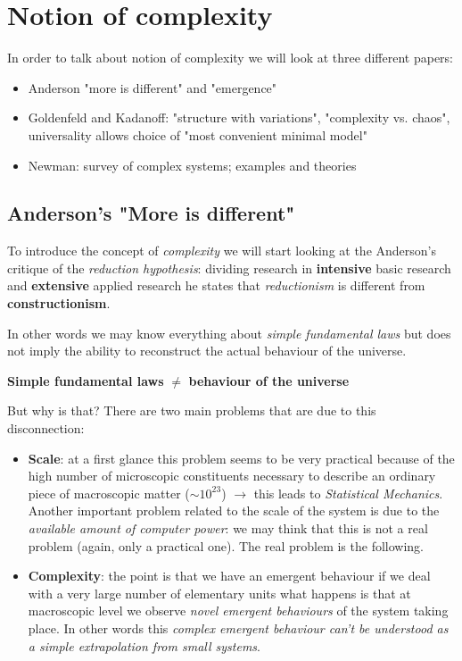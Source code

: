 \documentclass[\main/main.tex]{subfiles}
\begin{document}
\section{Notion of complexity}
In order to talk about notion of complexity we will look at three different papers:
\begin{itemize}
    \item Anderson "more is different" and "emergence"
    \item Goldenfeld and Kadanoff: "structure with variations", "complexity vs. chaos", universality allows choice of "most convenient minimal model"
    \item Newman: survey of complex systems; examples and theories
\end{itemize}

\subsection{Anderson's "More is different"}

To introduce the concept of \textit{complexity} we will start looking at the Anderson's critique of the \textit{reduction hypothesis}: dividing research in \textbf{intensive} basic research and \textbf{extensive} applied research he states that \textit{reductionism} is different from \textbf{constructionism}.

In other words we may know everything about \textit{simple fundamental laws} but does not imply the ability to reconstruct the actual behaviour of the universe.

\begin{center}
    \textbf{Simple fundamental laws} $\neq$ \textbf{behaviour of the universe}
\end{center}

\medskip

But why is that? There are two main problems that are due to this disconnection:
\begin{itemize}
    \item \textbf{Scale}: at a first glance this problem seems to be very practical because of the high number of microscopic constituents necessary to describe an ordinary piece of macroscopic matter ($\sim 10^{23}$) $\to$ this leads to \textit{Statistical Mechanics}.
    Another important problem related to the scale of the system is due to the \textit{available amount of computer power}: we may think that this is not a real problem (again, only a practical one). The real problem is the following. 
    \item \textbf{Complexity}: the point is that we have an emergent behaviour if we deal with a very large number of elementary units what happens is that at macroscopic level we observe \textit{novel emergent behaviours } of the system taking place.
    In other words this \textit{complex emergent behaviour can't be understood as a simple extrapolation from small systems}.
\end{itemize}
\end{document}
